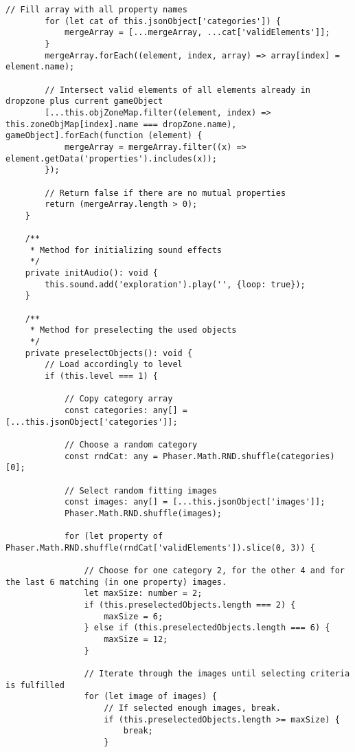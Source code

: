 \begin{lstlisting}[style=TypeScript, caption={restrictedSortingScene.ts}]
        // Fill array with all property names
        for (let cat of this.jsonObject['categories']) {
            mergeArray = [...mergeArray, ...cat['validElements']];
        }
        mergeArray.forEach((element, index, array) => array[index] = element.name);

        // Intersect valid elements of all elements already in dropzone plus current gameObject
        [...this.objZoneMap.filter((element, index) => this.zoneObjMap[index].name === dropZone.name), gameObject].forEach(function (element) {
            mergeArray = mergeArray.filter((x) => element.getData('properties').includes(x));
        });

        // Return false if there are no mutual properties
        return (mergeArray.length > 0);
    }

    /**
     * Method for initializing sound effects
     */
    private initAudio(): void {
        this.sound.add('exploration').play('', {loop: true});
    }

    /**
     * Method for preselecting the used objects
     */
    private preselectObjects(): void {
        // Load accordingly to level
        if (this.level === 1) {

            // Copy category array
            const categories: any[] = [...this.jsonObject['categories']];

            // Choose a random category
            const rndCat: any = Phaser.Math.RND.shuffle(categories)[0];

            // Select random fitting images
            const images: any[] = [...this.jsonObject['images']];
            Phaser.Math.RND.shuffle(images);

            for (let property of Phaser.Math.RND.shuffle(rndCat['validElements']).slice(0, 3)) {

                // Choose for one category 2, for the other 4 and for the last 6 matching (in one property) images.
                let maxSize: number = 2;
                if (this.preselectedObjects.length === 2) {
                    maxSize = 6;
                } else if (this.preselectedObjects.length === 6) {
                    maxSize = 12;
                }

                // Iterate through the images until selecting criteria is fulfilled
                for (let image of images) {
                    // If selected enough images, break.
                    if (this.preselectedObjects.length >= maxSize) {
                        break;
                    }


\end{lstlisting}
